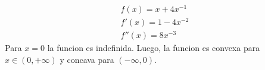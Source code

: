 \begin{homeworkProblem}

\begin{align*}
    f(x) = x + 4x^{-1}\\
    f'(x) = 1 - 4x^{-2}\\
    f''(x) = 8x^{-3}
\end{align*}
Para $x=0$ la funcion es indefinida. Luego, la funcion es convexa para $x \in (0,+\infty)$ y concava para $(-\infty,0)$.
\end{homeworkProblem}